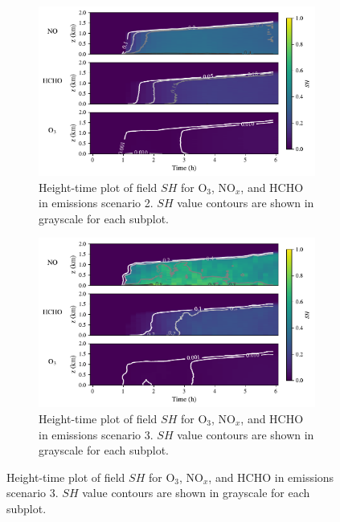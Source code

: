 \begin{figure}[h]
  \centering
  \begin{subfigure}
    \centering
    \includegraphics[width=.97\textwidth]{figures/chapter4/height-time-nsh-multivar-road-10x.pdf}
    \caption{Height-time plot of field $SH$ for O$_3$, NO$_x$, and HCHO in emissions scenario 2. $SH$ value contours are shown in grayscale for each subplot.}
  \end{subfigure}
     \vspace*{2mm} 
  \begin{subfigure}
    \centering
    \includegraphics[width=.97\textwidth]{figures/chapter4/height-time-nsh-multivar-point-source-1x1.pdf}
    \caption{Height-time plot of field $SH$ for O$_3$, NO$_x$, and HCHO in emissions scenario 3. $SH$ value contours are shown in grayscale for each subplot.}
  \end{subfigure}
 \end{figure}



